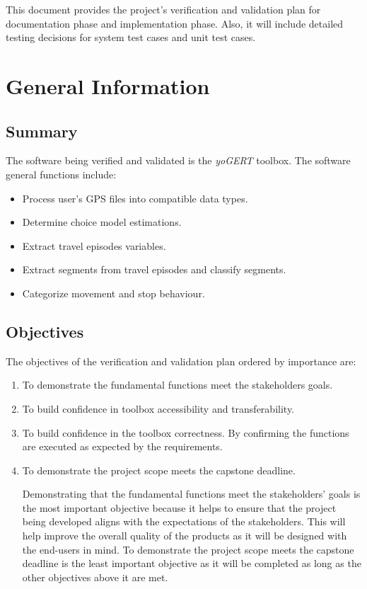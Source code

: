 \documentclass[12pt, titlepage]{article}
\begin{document}

This document provides the project's verification and 
validation plan for documentation phase and implementation phase. Also, it will include detailed testing decisions for system test cases and unit test cases.  

\section{General Information}

\subsection{Summary}
The software being verified and validated is the \emph{yoGERT} toolbox. The software general functions include:
\begin{itemize}
    \item Process user's GPS files into compatible data types.
    \item Determine choice model estimations.
    \item Extract travel episodes variables.
    \item Extract segments from travel episodes and classify segments.
    \item Categorize movement and stop behaviour. 
\end{itemize}


\subsection{Objectives}
The objectives of the verification and validation plan ordered by importance are:
\begin{enumerate}
    \item To demonstrate the fundamental functions meet the stakeholders goals.
    \item To build confidence in toolbox accessibility and transferability. 
    \item To build confidence in the toolbox correctness. By confirming the functions are executed as expected by the requirements. 
    \item To demonstrate the project scope meets the capstone deadline. 


Demonstrating that the fundamental functions meet the stakeholders' goals is the most important objective because it helps to ensure that the project being developed aligns with the expectations of the stakeholders. This will help improve the overall quality of the products as it will be designed with the end-users in mind. To demonstrate the project scope meets the capstone deadline is the least important objective as it will be completed as long as the other objectives above it are met. 

\end{enumerate}
\end{document}
